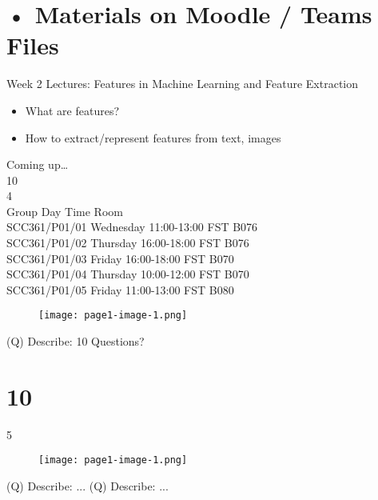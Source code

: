 \documentclass[12pt]{article}
\begin{document}
\section{• Materials on Moodle / Teams Files}
Week 2 Lectures: Features in Machine Learning and Feature Extraction\\
\begin{itemize}
  \item What are features?
  \item How to extract/represent features from text, images
\end{itemize}
Coming up…\\
10\\
4\\
Group Day Time Room\\
SCC361/P01/01 Wednesday 11:00-13:00 FST B076\\
SCC361/P01/02 Thursday 16:00-18:00 FST B076\\
SCC361/P01/03 Friday 16:00-18:00 FST B070\\
SCC361/P01/04 Thursday 10:00-12:00 FST B070\\
SCC361/P01/05 Friday 11:00-13:00 FST B080\\
\begin{figure}[H]
\texttt{[image: page1-image-1.png]}
\end{figure}
\clearpage
(Q)
Describe: 10
\clearpage
Questions?\\
\section{10}
5\\
\begin{figure}[H]
\texttt{[image: page1-image-1.png]}
\end{figure}
\clearpage
(Q)
Describe: ...
\clearpage
\clearpage
(Q)
Describe: ...
\clearpage
\\
\end{document}
